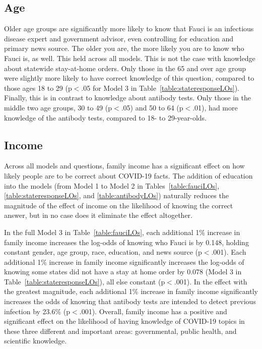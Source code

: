 \documentclass[11pt]{article}
\begin{document}
\subsection{Age}

Older age groups are significantly more likely to know that Fauci is an infectious disease expert and government advisor, even controlling for education and primary news source. The older you are, the more likely you are to know who  Fauci is, as well. %
This held across all models. 
This is not the case with knowledge about statewide stay-at-home orders. Only those in the 65 and over age group were slightly more likely to have correct knowledge of this question, compared to those ages 18 to 29 (p$<$.05 for Model 3 in Table~\ref{table:stateresponseLOs}). Finally, this is in contrast to knowledge about antibody tests. Only those in the middle two age groups, 30 to 49 (p$<$.05) and 50 to 64 (p$<$.01), had more knowledge of the antibody tests, compared to 18- to 29-year-olds. 


\subsection{Income}\label{sec:income}

Across all models and questions, family income has a significant effect on how likely people are to be correct about COVID-19 facts. The addition of education into the models (from Model 1 to Model 2 in Tables~\ref{table:fauciLOs}, \ref{table:stateresponseLOs}, and \ref{table:antibodyLOs}) naturally reduces the magnitude of the effect of income on the likelihood of knowing the correct answer, but in no case does it eliminate the effect altogether.

In the full Model 3 in Table~\ref{table:fauciLOs}, each additional 1\% increase in family income increases the log-odds of knowing who Fauci is by 0.148, holding constant gender, age group, race, education, and news source (p$<$.001). 
Each additional 1\% increase in family income significantly increases the log-odds of knowing some states did not have a stay at home order by 0.078 (Model 3 in Table~\ref{table:stateresponseLOs}), all else constant (p$<$.001).
In the effect with the greatest magnitude, each additional 1\% increase in family income significantly increases the odds of knowing that antibody tests are intended to detect previous infection by 23.6\% (p$<$.001). %
Overall, family income has a positive and significant effect on the likelihood of having knowledge of COVID-19 topics in these three different and important areas: governmental, public health, and scientific knowledge.
\end{document}
